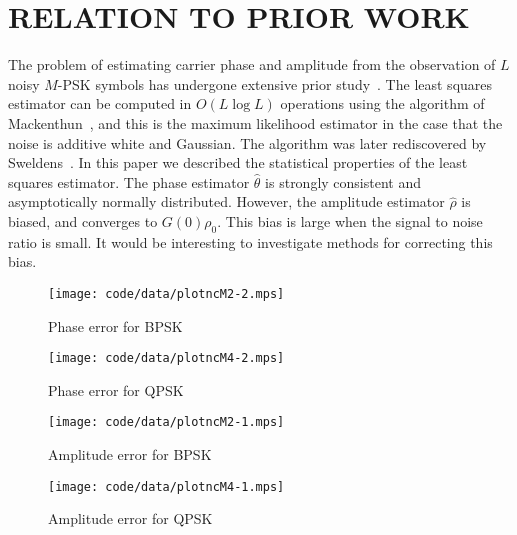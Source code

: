 \documentclass{article}
\begin{document}


\section{RELATION TO PRIOR WORK}

The problem of estimating carrier phase and amplitude from the observation of $L$ noisy $M$-PSK symbols has undergone extensive prior study~\cite{ViterbiViterbi_phase_est_1983,Cowley_ref_sym_carr_1998,Wilson1989,Makrakis1990,Liu1991,Mackenthun1994,Sweldens2001,McKilliamLinearTimeBlockPSK2009,Divsalar1990}.  The least squares estimator can be computed in $O(L\log L)$ operations using the algorithm of Mackenthun~\cite{Mackenthun1994}, and this is the maximum likelihood estimator in the case that the noise is additive white and Gaussian.  The algorithm was later rediscovered by Sweldens~\cite{Sweldens2001}.  In this paper we described the statistical properties of the least squares estimator. The phase estimator $\hat{\theta}$ is strongly consistent and asymptotically normally distributed.  However, the amplitude estimator $\hat{\rho}$ is biased, and converges to $G(0)\rho_0$.  This bias is large when the signal to noise ratio is small.  It would be interesting to investigate methods for correcting this bias. 

\begin{figure}[p]
	\centering
		\texttt{[image: code/data/plotncM2-2.mps]}
		\caption{Phase error for BPSK}
		\label{fig:plotphaseM2}
\end{figure}

\begin{figure}[p]
	\centering
		\texttt{[image: code/data/plotncM4-2.mps]}
		\caption{Phase error for QPSK}
		\label{fig:plotphaseM4}
\end{figure}

\begin{figure}[p]
	\centering
		\texttt{[image: code/data/plotncM2-1.mps]}
		\caption{Amplitude error for BPSK}
		\label{fig:plotampM2}
\end{figure}

\begin{figure}[p]
	\centering
		\texttt{[image: code/data/plotncM4-1.mps]}
		\caption{Amplitude error for QPSK}
		\label{fig:plotampM4}
\end{figure}


\vfill\pagebreak




\end{document}
